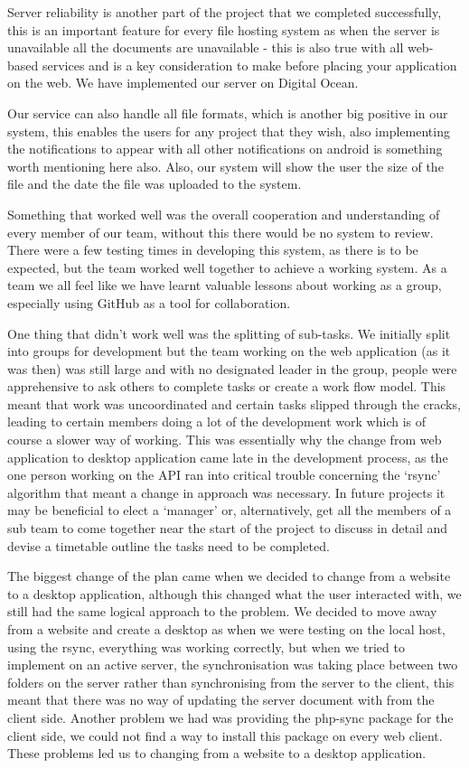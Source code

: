 \documentclass[11pt]{article}
\begin{document}
Server reliability is another part of the project that we completed successfully, this is an important feature for every file hosting system as when the server is unavailable all the documents are unavailable - this is also true with all web-based services and is a key consideration to make before placing your application on the web. We have implemented our server on Digital Ocean.

Our service can also handle all file formats, which is another big positive in our system, this enables the users for any project that they wish, also implementing the notifications to appear with all other notifications on android is something worth mentioning here also. Also, our system will show the user the size of the file and the date the file was uploaded to the system.

Something that worked well was the overall cooperation and understanding of every member of our team, without this there would be no system to review. There were a few testing times in developing this system, as there is to be expected, but the team worked well together to achieve a working system. As a team we all feel like we have learnt valuable lessons about working as a group, especially using GitHub as a tool for collaboration.

One thing that didn’t work well was the splitting of sub-tasks. We initially split into groups for development but the team working on the web application (as it was then) was still large and with no designated leader in the group, people were apprehensive to ask others to complete tasks or create a work flow model. This meant that work was uncoordinated and certain tasks slipped through the cracks, leading to certain members doing a lot of the development work which is of course a slower way of working. This was essentially why the change from web application to desktop application came late in the development process, as the one person working on the API ran into critical trouble concerning the ‘rsync’ algorithm that meant a change in approach was necessary. In future projects it may be beneficial to elect a ‘manager’ or, alternatively, get all the members of a sub team to come together near the start of the project to discuss in detail and devise a timetable outline the tasks need to be completed. 

The biggest change of the plan came when we decided to change from a website to a desktop application, although this changed what the user interacted with, we still had the same logical approach to the problem. We decided to move away from a website and create a desktop as when we were testing on the local host, using the rsync, everything was working correctly, but when we tried to implement on an active server, the synchronisation was taking place between two folders on the server rather than synchronising from the server to the client, this meant that there was no way of updating the server document with from the client side. Another problem we had was providing the php-sync package for the client side, we could not find a way to install this package on every web client.  These problems led us to changing from a website to a desktop application.
\end{document}
